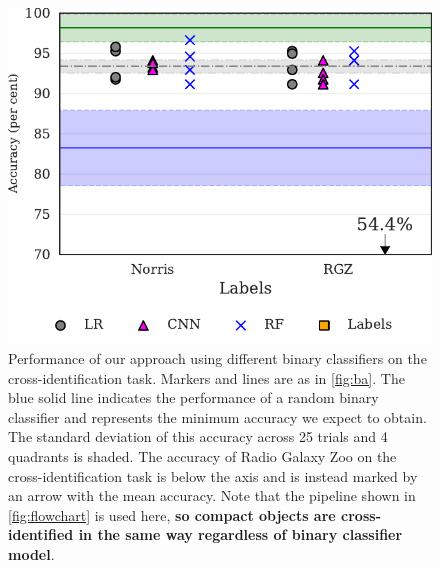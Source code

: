 \documentclass[fleqn,usenatbib,usedcolumn]{mnras}
\newcommand{\edited}[1]{{\bf {#1}}}
\begin{document}
    \begin{figure}
      \centering
      \includegraphics[width=0.9\columnwidth]{images/cdfs_cross_identification_grid.pdf}
      \caption{Performance of our approach using different binary classifiers on the cross-identification task. Markers and lines are as in \autoref{fig:ba}. The blue solid line indicates the performance of a random binary classifier and represents the minimum accuracy we expect to obtain. The standard deviation of this accuracy across 25 trials and 4 quadrants is shaded. The accuracy of Radio Galaxy Zoo on the cross-identification task is below the axis and is instead marked by an arrow with the mean accuracy. Note that the pipeline shown in \autoref{fig:flowchart} is used here, \edited{so compact objects are cross-identified in the same way regardless of binary classifier model}. \label{fig:cross-id-accuracy}}
    \end{figure}
\end{document}
